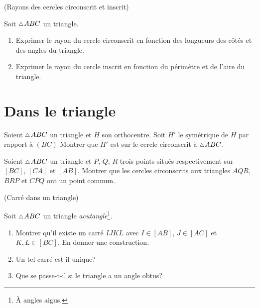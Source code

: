 \documentclass[a4paper,11pt,reqno]{amsart}
\begin{document}
\begin{exo} (Rayons des cercles circonscrit et inscrit)

  Soit $\tri ABC$ un triangle.
  \begin{enumerate}
    \item Exprimer le rayon du cercle circonscrit en fonction des longueurs des côtés et des angles du triangle.
    \item Exprimer le rayon du cercle inscrit en fonction du périmètre et de l'aire du triangle.
  \end{enumerate}
\end{exo}


\section{Dans le triangle}

\begin{exo}[.7]

  Soient $\tri ABC$ un triangle et $H$  son orthocentre. Soit $H'$ le symétrique de $H$ par rapport à $(BC)$ Montrer que $H'$ est sur le cercle circonscrit à $\tri ABC$.
\end{exo}

\begin{exo}[.7]

  Soient $\tri ABC$ un triangle et $P$, $Q$, $R$ trois points situés respectivement sur $[BC]$, $[CA]$ et $[AB]$. Montrer que les cercles circonscrits aux triangles $AQR$, $BRP$ et $CPQ$ ont un point commun.
\end{exo}


\begin{exo} (Carré dans un  triangle)

  Soit $\tri ABC$ un triangle \emph{acutangle}\footnote{À angles aigus.}.
  \begin{enumerate}
    \item Montrer qu'il existe un carré $IJKL$ avec $I \in [AB]$, $J \in [AC]$ et $K,L \in [BC]$. En donner une construction.
    \item Un tel carré est-il unique?
    \item Que se passe-t-il si le triangle a un angle obtus?
  \end{enumerate}
\end{exo}
\end{document}
